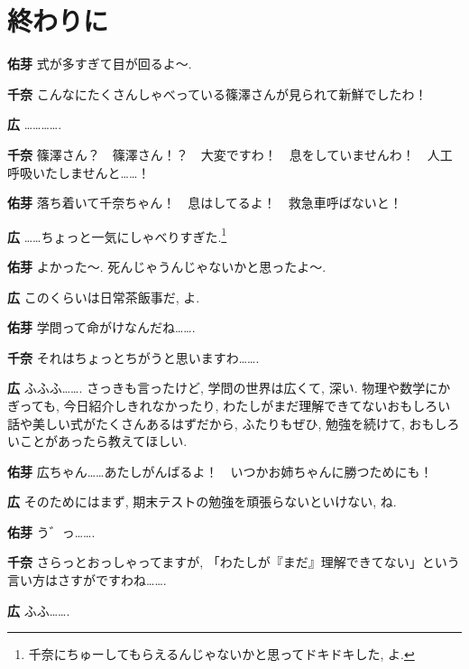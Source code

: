 \documentclass{ltjsarticle}
\theoremstyle{definition}
\newcommand{\parno}{\par\noindent}
\begin{document}
\section{終わりに}
\parno
\textbf{佑芽} 式が多すぎて目が回るよ〜.\parno
\textbf{千奈} こんなにたくさんしゃべっている篠澤さんが見られて新鮮でしたわ！\parno
\textbf{広} ………….\parno
\textbf{千奈} 篠澤さん？　篠澤さん！？　大変ですわ！　息をしていませんわ！　人工呼吸いたしませんと……！\parno
\textbf{佑芽} 落ち着いて千奈ちゃん！　息はしてるよ！　救急車呼ばないと！\parno
\textbf{広} ……ちょっと一気にしゃべりすぎた.\footnote{千奈にちゅーしてもらえるんじゃないかと思ってドキドキした, よ.}\parno
\textbf{佑芽} よかった〜. 死んじゃうんじゃないかと思ったよ〜.\parno
\textbf{広} このくらいは日常茶飯事だ, よ.\parno
\textbf{佑芽} 学問って命がけなんだね…….\parno
\textbf{千奈} それはちょっとちがうと思いますわ…….\parno
\textbf{広} ふふふ……. さっきも言ったけど, 学問の世界は広くて, 深い. 物理や数学にかぎっても, 今日紹介しきれなかったり, わたしがまだ理解できてないおもしろい話や美しい式がたくさんあるはずだから, ふたりもぜひ, 勉強を続けて, おもしろいことがあったら教えてほしい.\parno
\textbf{佑芽} 広ちゃん……あたしがんばるよ！　いつかお姉ちゃんに勝つためにも！\parno
\textbf{広} そのためにはまず, 期末テストの勉強を頑張らないといけない, ね.\parno
\textbf{佑芽} う゛っ…….\parno
\textbf{千奈} さらっとおっしゃってますが, 「わたしが『まだ』理解できてない」という言い方はさすがですわね…….\parno
\textbf{広} ふふ…….
\end{document}
